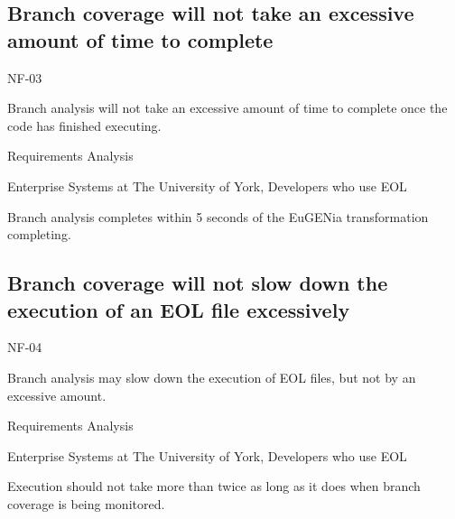 \subsection{Branch coverage will not take an excessive amount of time to complete}
\begin{description}[style=sameline,leftmargin=4.5cm,nolistsep]
\item[\hspace*{0.3cm}Label] NF-03
\item[\hspace*{0.3cm}Description] Branch analysis will not take an excessive amount of time to complete once the code has finished executing.
\item[\hspace*{0.3cm}Source] Requirements Analysis
\item[\hspace*{0.3cm}Stakeholders] Enterprise Systems at The University of York, Developers who use EOL
\item[\hspace*{0.3cm}Satisfiable Conditions] Branch analysis completes within 5 seconds of the EuGENia transformation completing.
\end{description}

\subsection{Branch coverage will not slow down the execution of an EOL file excessively}
\begin{description}[style=sameline,leftmargin=4.5cm,nolistsep]
\item[\hspace*{0.3cm}Label] NF-04
\item[\hspace*{0.3cm}Description] Branch analysis may slow down the execution of EOL files, but not by an excessive amount.
\item[\hspace*{0.3cm}Source] Requirements Analysis
\item[\hspace*{0.3cm}Stakeholders] Enterprise Systems at The University of York, Developers who use EOL
\item[\hspace*{0.3cm}Satisfiable Conditions] Execution should not take more than twice as long as it does when branch coverage is being monitored.
\end{description}


